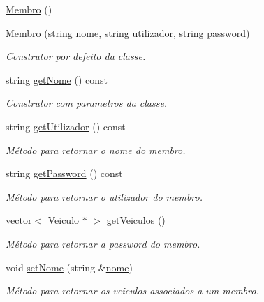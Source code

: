 \begin{DoxyCompactItemize}
\item 
\hyperlink{class_membro_a29dfd4ec647ea5cdefcd11d85deb5d1d}{Membro} ()
\item 
\hyperlink{class_membro_a2dc48d0c0febf2d3270128734bdce7d0}{Membro} (string \hyperlink{class_membro_a2598bbe34ae32a98f41468b2202a9555}{nome}, string \hyperlink{class_membro_a42cc733ff94ec8d1bbfdacc62dfbb0e7}{utilizador}, string \hyperlink{class_membro_ae2b12fc3e91efc674c07e735edf4ac21}{password})
\begin{DoxyCompactList}\small\item\em Construtor por defeito da classe. \end{DoxyCompactList}\item 
string \hyperlink{class_membro_af7cfd42d45960183ccf1002246cb0bd2}{get\+Nome} () const 
\begin{DoxyCompactList}\small\item\em Construtor com parametros da classe. \end{DoxyCompactList}\item 
string \hyperlink{class_membro_ae124b54c2b8572e531c873788263222d}{get\+Utilizador} () const 
\begin{DoxyCompactList}\small\item\em Método para retornar o nome do membro. \end{DoxyCompactList}\item 
string \hyperlink{class_membro_af9c84eb5f83b1fd64d4c542f419d6953}{get\+Password} () const 
\begin{DoxyCompactList}\small\item\em Método para retornar o utilizador do membro. \end{DoxyCompactList}\item 
vector$<$ \hyperlink{class_veiculo}{Veiculo} $\ast$ $>$ \hyperlink{class_membro_afdd3c41bfc8e859bb8762516440c8144}{get\+Veiculos} ()
\begin{DoxyCompactList}\small\item\em Método para retornar a password do membro. \end{DoxyCompactList}\item 
void \hyperlink{class_membro_a87f95f3869ef8ce4cfaf673cff30cdcc}{set\+Nome} (string \&\hyperlink{class_membro_a2598bbe34ae32a98f41468b2202a9555}{nome})
\begin{DoxyCompactList}\small\item\em Método para retornar os veiculos associados a um membro. \end{DoxyCompactList}\item 

\end{DoxyCompactItemize}
